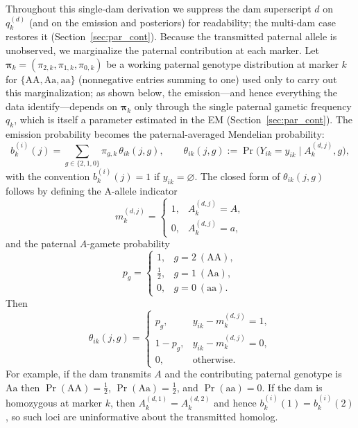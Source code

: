 \documentclass[11pt]{article}
\begin{document}
Throughout this single-dam derivation we suppress the dam superscript $d$ on $q_k^{(d)}$ (and on the
emission and posteriors) for readability; the multi-dam case restores it (Section~\ref{sec:par_cont}).
Because the transmitted paternal allele is unobserved, we marginalize the paternal contribution at
each marker. Let $\boldsymbol\pi_k=(\pi_{2,k},\pi_{1,k},\pi_{0,k})$ be a working paternal genotype
distribution at marker $k$ for $\{\mathrm{AA},\mathrm{Aa},\mathrm{aa}\}$ (nonnegative entries summing
to one) used only to carry out this marginalization; as shown below, the emission---and hence
everything the data identify---depends on $\boldsymbol\pi_k$ only through the single paternal gametic
frequency $q_k$, which is itself a parameter estimated in the EM (Section~\ref{sec:par_cont}). The
emission probability becomes the paternal-averaged Mendelian probability:
\begin{equation}
b_k^{(i)}(j)=\sum_{g\in\{2,1,0\}} \pi_{g,k}\,\theta_{ik}(j,g),
\qquad
\theta_{ik}(j,g):=\Pr\!\big(Y_{ik}=y_{ik}\mid A_k^{(d,j)},g\big),
\label{eq:emis-average}
\end{equation}
with the convention $b_k^{(i)}(j)=1$ if $y_{ik}=\varnothing$. The closed form of
$\theta_{ik}(j,g)$ follows by defining the A-allele indicator
\[
m_k^{(d,j)}=
\begin{cases}
1,& A_k^{(d,j)}=A,\\
0,& A_k^{(d,j)}=a,
\end{cases}
\]
and the paternal $A$-gamete probability
\[
p_g=
\begin{cases}
1,& g=2\ (\mathrm{AA}),\\[2pt]
\tfrac12,& g=1\ (\mathrm{Aa}),\\[2pt]
0,& g=0\ (\mathrm{aa}).
\end{cases}
\]
Then
\begin{equation}
\theta_{ik}(j,g)=
\begin{cases}
p_g,      & y_{ik}-m_k^{(d,j)}=1,\\[4pt]
1-p_g,    & y_{ik}-m_k^{(d,j)}=0,\\[4pt]
0,        & \text{otherwise.}
\end{cases}
\label{eq:theta-cases}
\end{equation}
For example, if the dam transmits $A$ and the contributing paternal genotype is $\mathrm{Aa}$ then
$\Pr(\mathrm{AA})=\tfrac12$, $\Pr(\mathrm{Aa})=\tfrac12$, and $\Pr(\mathrm{aa})=0$.
If the dam is homozygous at marker $k$, then $A_k^{(d,1)}=A_k^{(d,2)}$ and hence
$b_k^{(i)}(1)=b_k^{(i)}(2)$, so such loci are uninformative about the transmitted homolog.
\end{document}
